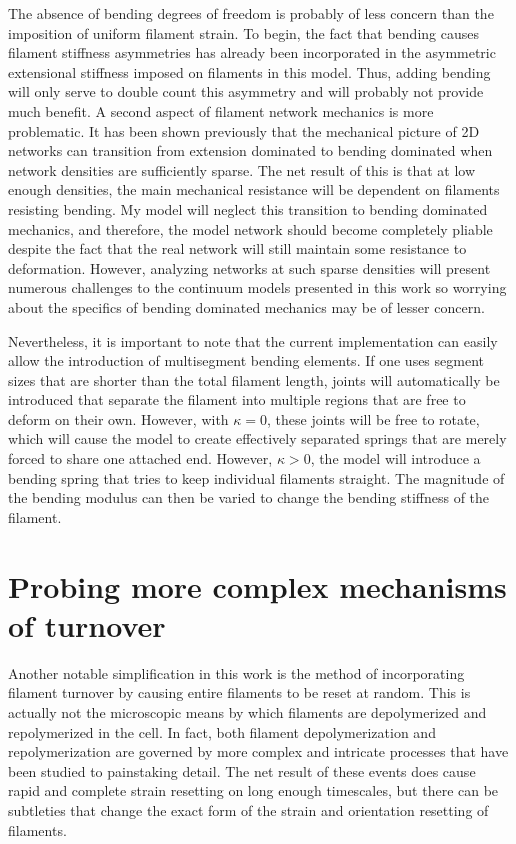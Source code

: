 The absence of bending degrees of freedom is probably of less concern than the imposition of uniform filament strain. To begin, the fact that bending causes filament stiffness asymmetries has already been incorporated in the asymmetric extensional stiffness imposed on filaments in this model.  Thus, adding bending will only serve to double count this asymmetry and will probably not provide much benefit. A second aspect of filament network mechanics is more problematic.  It has been shown previously that the mechanical picture of 2D networks can transition from extension dominated to bending dominated when network densities are sufficiently sparse.  The net result of this is that at low enough densities, the main mechanical resistance will be dependent on filaments resisting bending.  My model will neglect this transition to bending dominated mechanics, and therefore, the model network should become completely pliable despite the fact that the real network will still maintain some resistance to deformation.  However, analyzing networks at such sparse densities will present numerous challenges to the continuum models presented in this work so worrying about the specifics of bending dominated mechanics may be of lesser concern.

Nevertheless, it is important to note that the current implementation can easily allow the introduction of multisegment bending elements.  If one uses segment sizes that are shorter than the total filament length, joints will automatically be introduced that separate the filament into multiple regions that are free to deform on their own.  However, with $\kappa=0$, these joints will be free to rotate, which will cause the model to create effectively separated springs that are merely forced to share one attached end.  However, $\kappa>0$, the model will introduce a bending spring that tries to keep individual filaments straight.  The magnitude of the bending modulus can then be varied to change the bending stiffness of the filament.  

\section{Probing more complex mechanisms of turnover}

Another notable simplification in this work is the method of incorporating filament turnover by causing entire filaments to be reset at random.  This is actually not the microscopic means by which filaments are depolymerized and repolymerized in the cell. In fact, both filament depolymerization and repolymerization are governed by more complex and intricate processes that have been studied to painstaking detail.  The net result of these events does cause rapid and complete strain resetting on long enough timescales, but there can be subtleties that change the exact form of the strain and orientation resetting of filaments.

